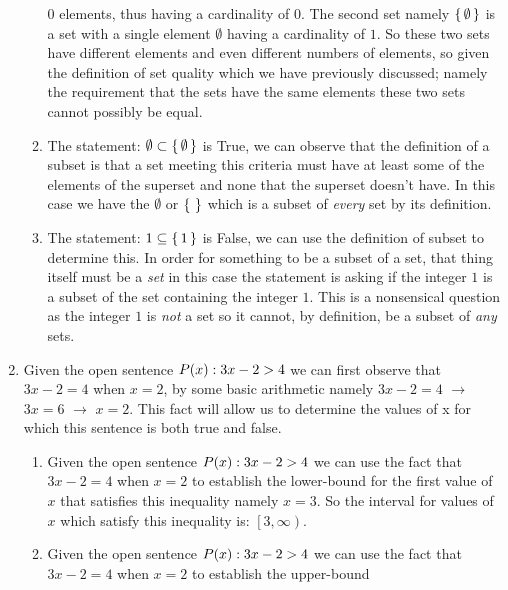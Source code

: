 \documentclass[12pt]{article}
\makeatletter
\newcommand*{\arabicodd}[1]{%
  \expandafter\@arabicodd\csname c@#1\endcsname
}
\newcommand*{\@arabicodd}[1]{%
  \@arabic{\numexpr(#1)*2-1\relax}%
}
\makeatother
\begin{document}
\begin{enumerate}[label=2.\arabicodd*]
\begin{enumerate}[label=(\alph*)]
              $0$ elements, thus having a cardinality of $0$. The second set
              namely $\set{\emptyset}$ is a set with a single element $\emptyset$
              having a cardinality of $1$. So these two sets have different
              elements and even different numbers of elements, so given the
              definition of set quality which we have previously discussed;
              namely the requirement that the sets have the same elements
              these two sets cannot possibly be equal.
        \item The statement: $\emptyset \subset \set{\emptyset}$ is True, we
              can observe that the definition of a subset is that a set meeting
              this criteria must have at least some of the elements of the
              superset and none that the superset doesn't have. In this case
              we have the $\emptyset$ or $\set{}$ which is a subset of \emph{every}
              set by its definition.
        \item The statement: $1 \subseteq \set{1}$ is False, we can use
              the definition of subset to determine this. In order for something
              to be a subset of a set, that thing itself must be a \emph{set}
              in this case the statement is asking if the integer $1$ is a subset
              of the set containing the integer $1$. This is a nonsensical question
              as the integer $1$ is \emph{not} a set so it cannot, by definition,
              be a subset of \emph{any} sets.
      \end{enumerate}
    \item
        Given the open sentence $P\qty(x) : 3x - 2 > 4$ we can first observe
        that $3x - 2 = 4$ when $x=2$, by some basic arithmetic namely $3x-2=4$
        $\rightarrow$ $3x=6$ $\rightarrow$ $x=2.$ This fact will allow us to
        determine the values of x for which this sentence is both true and false.
      \begin{enumerate}[label=(\alph*)]
        \item Given the open sentence $P\qty(x) : 3x - 2 > 4$ we can use
              the fact that $3x-2=4$ when $x=2$ to establish the lower-bound
              for the first value of $x$ that satisfies this inequality namely
              $x=3.$ So the interval for values of $x$ which satisfy this inequality
              is: $\left[3, \infty \right).$
        \item Given the open sentence $P\qty(x) : 3x - 2 > 4$ we can use
            the fact that $3x-2=4$ when $x=2$ to establish the upper-bound

\end{enumerate}
\end{enumerate}
\end{document}
